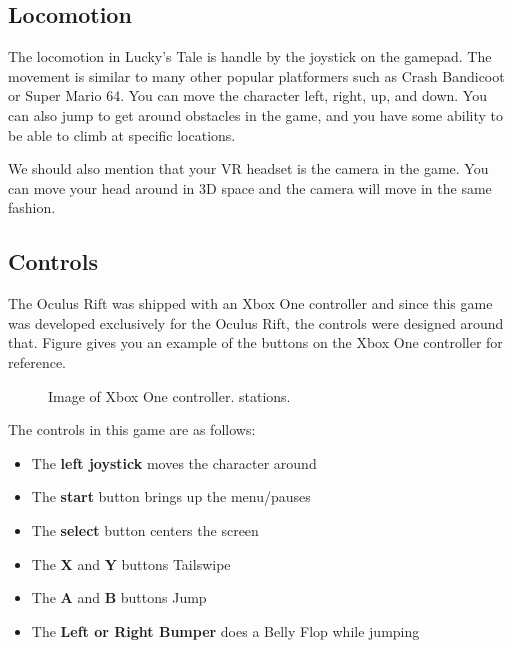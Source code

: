 \documentclass[journal]{IEEEtran}
\begin{document}
\subsection{Locomotion}
The locomotion in Lucky's Tale is handle by the joystick on the gamepad. The movement is similar to many other popular platformers such as Crash Bandicoot or Super Mario 64. You can move the character left, right, up, and down. You can also jump to get around obstacles in the game, and you have some ability to be able to climb at specific locations. 

We should also mention that your VR headset is the camera in the game. You can move your head around in 3D space and the camera will move in the same fashion. 

\subsection{Controls}
The Oculus Rift was shipped with an Xbox One controller and since this game was developed exclusively for the Oculus Rift, the controls were designed around that. Figure gives you an example of the buttons on the Xbox One controller for reference.
\begin{figure}[H]
	
	\noindent
	\caption{Image of Xbox One controller.  stations.\cite{xbox_one_controller_buttons}}\label{xbox_one_controller}
\end{figure}

The controls in this game are as follows: 

\begin{itemize}
	\item The \textbf{left joystick} moves the character around
	\item The \textbf{start} button brings up the menu/pauses
	\item The \textbf{select} button centers the screen
	\item The \textbf{X} and \textbf{Y} buttons Tailswipe
	\item The \textbf{A} and \textbf{B} buttons Jump
	\item The \textbf{Left or Right Bumper} does a Belly Flop while jumping
\end{itemize}
\end{document}
